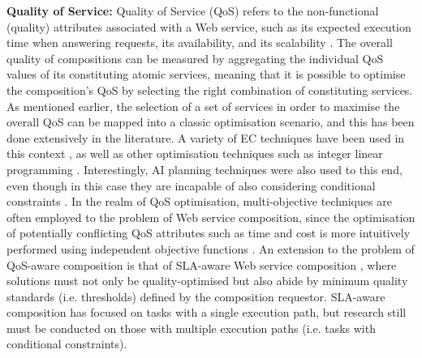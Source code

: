 \begin{enumerate}
  \textbf{Quality of Service:} Quality of Service (QoS) refers to the non-functional (quality) attributes associated with a Web service, such as its expected execution time when answering requests, its availability, and its scalability \cite{ko2008quality}. The overall quality of compositions can be measured by aggregating the individual QoS values of its constituting atomic services, meaning that it is possible to optimise the composition's QoS by selecting the right combination of constituting services. As mentioned earlier, the selection of a set of services in order to maximise the overall QoS can be mapped into a classic optimisation scenario, and this has been done extensively in the literature. A variety of EC techniques have been used in this context \cite{wang2012survey}, as well as other optimisation techniques such as integer linear programming \cite{yoo2008web}. Interestingly, AI planning techniques were also used to this end, even though in this case they are incapable of also considering conditional constraints \cite{deng2013efficient}. In the realm of QoS optimisation, multi-objective techniques are often employed to the problem of Web service composition, since the optimisation of potentially conflicting QoS attributes such as time and cost is more intuitively performed using independent objective functions \cite{liu2005dynamic}. An extension to the problem of QoS-aware composition is that of SLA-aware Web service composition \cite{yin2014hybrid}, where solutions must not only be quality-optimised but also abide by minimum quality standards (i.e. thresholds) defined by the composition requestor. SLA-aware composition has focused on tasks with a single execution path, but research still must be conducted on those with multiple execution paths (i.e. tasks with conditional constraints).


\end{enumerate}
